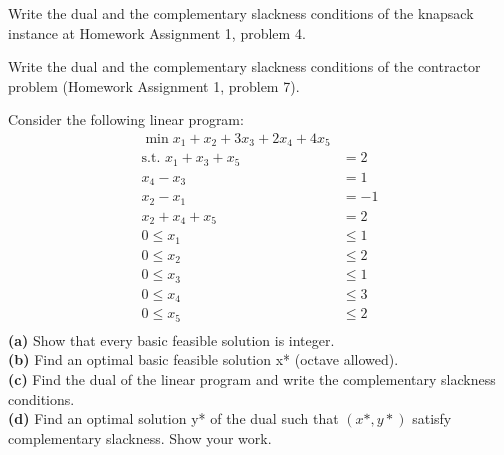 \documentclass[fleqn]{homework}
\begin{document}
  \begin{problem}{3}
    \begin{question}
      Write the dual and the complementary slackness conditions of the knapsack
      instance at Homework Assignment 1, problem 4.
    \end{question}
  \end{problem}

  \begin{problem}{4}
    \begin{question}
      Write the dual and the complementary slackness conditions of the
      contractor problem (Homework Assignment 1, problem 7).
    \end{question}
  \end{problem}

  \begin{problem}{5}
    \begin{question}
      Consider the following linear program:
      \begin{align*}
        \min x_1 + x_2 + 3x_3 + 2x_4 + 4x_5 & \\
        \text{s.t. } x_1 + x_3 + x_5 &= 2 \\
        x_4 - x_3 &= 1 \\
        x_2 - x_1 &= -1 \\
        x_2 + x_4 + x_5 &= 2 \\
        0 \le x_1 &\le 1 \\
        0 \le x_2 &\le 2 \\
        0 \le x_3 &\le 1 \\
        0 \le x_4 &\le 3 \\
        0 \le x_5 &\le 2 \\
      \end{align*}
      \textbf{(a)} Show that every basic feasible solution is integer.\\
      \textbf{(b)} Find an optimal basic feasible solution x* (octave allowed).\\
      \textbf{(c)} Find the dual of the linear program and write the
      complementary slackness conditions.\\
      \textbf{(d)} Find an optimal solution y* of the dual such that $(x*, y*)$
      satisfy complementary slackness. Show your work.\\
    \end{question}
  \end{problem}
\end{document}
